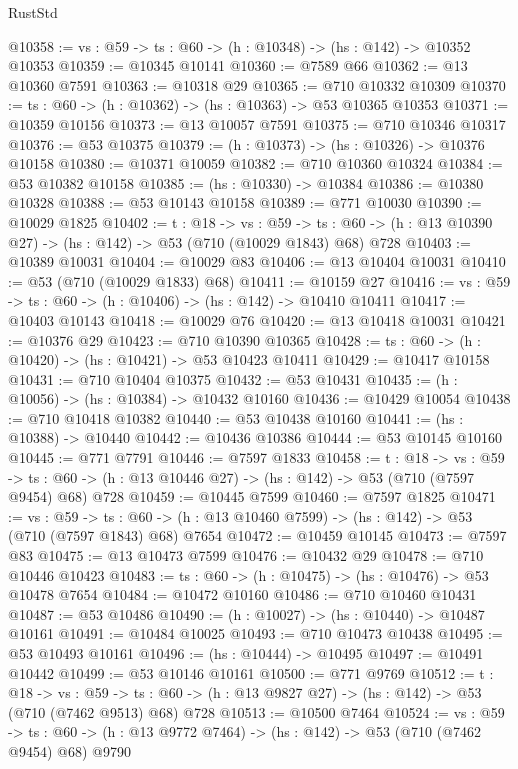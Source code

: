 \begin{lexlean}{RustStd}
\begin{coremodule}
@10358 := {vs : @59} -> {ts : @60} -> (h : @10348) -> (hs : @142) -> @10352 @10353
@10359 := @10345 @10141
@10360 := @7589 @66
@10362 := @13 @10360 @7591
@10363 := @10318 @29
@10365 := @710 @10332 @10309
@10370 := {ts : @60} -> (h : @10362) -> (hs : @10363) -> @53 @10365 @10353
@10371 := @10359 @10156
@10373 := @13 @10057 @7591
@10375 := @710 @10346 @10317
@10376 := @53 @10375
@10379 := (h : @10373) -> (hs : @10326) -> @10376 @10158
@10380 := @10371 @10059
@10382 := @710 @10360 @10324
@10384 := @53 @10382 @10158
@10385 := (hs : @10330) -> @10384
@10386 := @10380 @10328
@10388 := @53 @10143 @10158
@10389 := @771 @10030
@10390 := @10029 @1825
@10402 := {t : @18} ->
  {vs : @59} ->
  {ts : @60} -> (h : @13 @10390 @27) -> (hs : @142) -> @53 (@710 (@10029 @1843) @68) @728
@10403 := @10389 @10031
@10404 := @10029 @83
@10406 := @13 @10404 @10031
@10410 := @53 (@710 (@10029 @1833) @68)
@10411 := @10159 @27
@10416 := {vs : @59} -> {ts : @60} -> (h : @10406) -> (hs : @142) -> @10410 @10411
@10417 := @10403 @10143
@10418 := @10029 @76
@10420 := @13 @10418 @10031
@10421 := @10376 @29
@10423 := @710 @10390 @10365
@10428 := {ts : @60} -> (h : @10420) -> (hs : @10421) -> @53 @10423 @10411
@10429 := @10417 @10158
@10431 := @710 @10404 @10375
@10432 := @53 @10431
@10435 := (h : @10056) -> (hs : @10384) -> @10432 @10160
@10436 := @10429 @10054
@10438 := @710 @10418 @10382
@10440 := @53 @10438 @10160
@10441 := (hs : @10388) -> @10440
@10442 := @10436 @10386
@10444 := @53 @10145 @10160
@10445 := @771 @7791
@10446 := @7597 @1833
@10458 := {t : @18} ->
  {vs : @59} ->
  {ts : @60} -> (h : @13 @10446 @27) -> (hs : @142) -> @53 (@710 (@7597 @9454) @68) @728
@10459 := @10445 @7599
@10460 := @7597 @1825
@10471 := {vs : @59} ->
  {ts : @60} -> (h : @13 @10460 @7599) -> (hs : @142) -> @53 (@710 (@7597 @1843) @68) @7654
@10472 := @10459 @10145
@10473 := @7597 @83
@10475 := @13 @10473 @7599
@10476 := @10432 @29
@10478 := @710 @10446 @10423
@10483 := {ts : @60} -> (h : @10475) -> (hs : @10476) -> @53 @10478 @7654
@10484 := @10472 @10160
@10486 := @710 @10460 @10431
@10487 := @53 @10486
@10490 := (h : @10027) -> (hs : @10440) -> @10487 @10161
@10491 := @10484 @10025
@10493 := @710 @10473 @10438
@10495 := @53 @10493 @10161
@10496 := (hs : @10444) -> @10495
@10497 := @10491 @10442
@10499 := @53 @10146 @10161
@10500 := @771 @9769
@10512 := {t : @18} ->
  {vs : @59} ->
  {ts : @60} -> (h : @13 @9827 @27) -> (hs : @142) -> @53 (@710 (@7462 @9513) @68) @728
@10513 := @10500 @7464
@10524 := {vs : @59} ->
  {ts : @60} -> (h : @13 @9772 @7464) -> (hs : @142) -> @53 (@710 (@7462 @9454) @68) @9790

\end{coremodule}
\end{lexlean}
